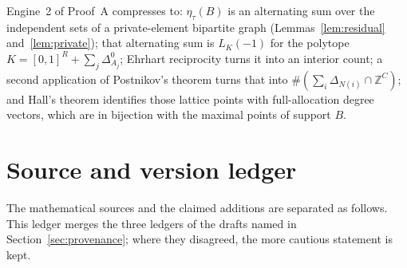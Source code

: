 \documentclass[11pt]{article}
\numberwithin{equation}{section}
\theoremstyle{definition}
\theoremstyle{remark}
\newcommand{\Z}{\mathbb Z}
\newcommand{\Dz}[1]{\Delta^{0}_{#1}}
\begin{document}
Engine~2 of Proof~A compresses to: $\eta_\tau(B)$ is an alternating sum over
the independent sets of a private-element bipartite graph
(Lemmas~\ref{lem:residual} and~\ref{lem:private}); that alternating sum is
$L_K(-1)$ for the polytope $K=[0,1]^R+\sum_j\Dz{A_j}$; Ehrhart reciprocity
turns it into an interior count; a second application of Postnikov's theorem
turns that into $\#(\sum_i\Delta_{N(i)}\cap\Z^{C})$; and Hall's theorem
identifies those lattice points with full-allocation degree vectors, which are
in bijection with the maximal points of support $B$.

\section{Source and version ledger}
\label{app:ledger}

The mathematical sources and the claimed additions are separated as follows.
This ledger merges the three ledgers of the drafts named in
Section~\ref{sec:provenance}; where they disagreed, the more cautious
statement is kept.
\end{document}

